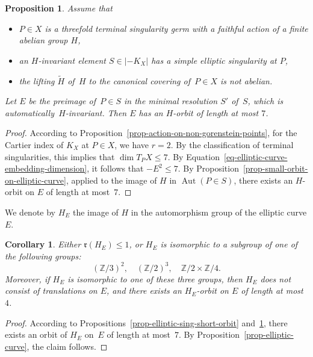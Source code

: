 \documentclass[11pt]{amsart}
\numberwithin{equation}{section}
\newtheorem{proposition}[thm]{Proposition}
\newtheorem{corollary}[thm]{Corollary}
\theoremstyle{definition}
\theoremstyle{remark}
\DeclareMathOperator{\Aut}{Aut}
\begin{document}
\begin{proposition}
\label{prop-elliptic-sing-short-orbit-2}
Assume that  
\begin{itemize}
\item
$P\in X$ is a threefold terminal singularity germ with a faithful action of a finite abelian group $H$,
\item
an $H$-invariant element $S\in |-K_X|$ has a simple elliptic singularity at $P$,
\item
the lifting $\widetilde{H}$ of\, $H$ to the canonical covering of\, $P\in X$ is not abelian. 
\end{itemize}
Let $E$ be the preimage of\, $P\in S$ in the minimal resolution $S'$ of\, $S$, which is automatically~$H$-invariant.  Then $E$ has an $H$-orbit of length at most $7$.
\end{proposition}

\begin{proof}
According to Proposition~\ref{prop-action-on-non-gorenstein-points}, for the Cartier index of $K_X$ at $P\in X$, we have $r=2$. By the classification of terminal singularities, this implies that $\dim T_P X\leq 7$. By Equation~\eqref{eq-elliptic-curve-embedding-dimension}, it follows that $-E^2\leq 7$. 
By Proposition~\ref{prop-small-orbit-on-elliptic-curve}, applied to the image of $H$ in $\Aut(P\in S)$, there exists an $H$-orbit on $E$ of length at most~$7$. 
\end{proof}

We denote by $H_E$ the image of $H$ in the automorphism group of the elliptic curve $E$.

\begin{corollary}
\label{cor-irreducible-HE}
Either $\mathfrak{r}(H_E)\leq 1$, or $H_E$ is isomorphic to a subgroup of one of the following groups:
\begin{equation}
\label{eq-GE-3-cases}
(\mathbb{Z}/3)^2, \quad(\mathbb{Z}/2)^3,\quad \mathbb{Z}/2\times\mathbb{Z}/4. 
\end{equation}
Moreover, if $H_E$ is isomorphic to one of these three groups, then $H_E$ does not consist of translations on $E$, and there exists an $H_E$-orbit on $E$ of length at most $4$. 
\end{corollary}

\begin{proof}
 According to Propositions~\ref{prop-elliptic-sing-short-orbit} and~\ref{prop-elliptic-sing-short-orbit-2}, there exists an orbit of $H_E$ on~$E$ of length at most~$7$. By Proposition~\ref{prop-elliptic-curve}, the claim follows.
\end{proof}
\end{document}
